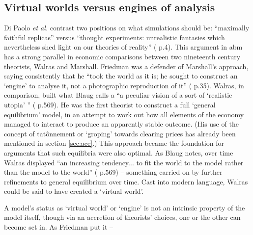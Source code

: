 \subsection{Virtual worlds versus engines of analysis \label{sec:virtualworlds}}

Di Paolo \emph{et al.} contrast two positions on what simulations should be: ``maximally faithful replicas'' versus ``thought experiments: unrealistic fantasies which nevertheless shed light on our theories of reality'' (\citealt{di_paolo_simulation_2000} p.4). This argument in \gls{abm} has a strong parallel in economic comparisons between two nineteenth century theorists, Walras and Marshall. Friedman was a defender of Marshall's approach, saying consistently that he ``took the world as it is; he sought to construct an `engine' to analyse it, not a photographic reproduction of it'' (\citealt{friedman_essays_1953} p.35). Walras, in comparison, built what Blaug calls a ``a peculiar vision of a sort of `realistic utopia' '' (\citealt{blaug_economic_1997} p.569). He was the first theorist to construct a full `general equilibrium' model, in an attempt to work out how all elements of the economy managed to interact to produce an apparently stable outcome. (His use of the concept of tat\^{o}nnement or `groping' towards clearing prices has already been mentioned in section \ref{sec:ace}.) This approach became the foundation for arguments that such equilibria were also optimal. As Blaug notes, over time Walras displayed ``an increasing tendency...  to fit the world to the model rather than the model to the world'' (\citealt{blaug_economic_1997} p.569) – something carried on by further refinements to general equilibrium over time. Cast into modern language, Walras could be said to have created a `virtual world'.

A model's status as `virtual world' or `engine' is not an intrinsic property of the model itself, though via an accretion of theorists' choices, one or the other can become set in. As Friedman put it –

